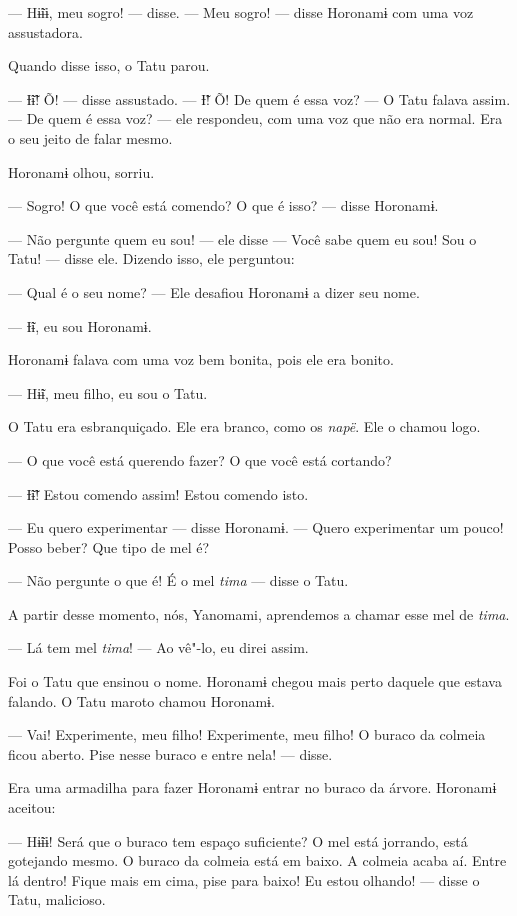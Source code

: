 --- Hɨ̃ɨɨ, meu sogro! --- disse. --- Meu sogro! --- disse Horonamɨ com
uma voz assustadora. 

Quando disse isso, o Tatu parou. 

--- Ɨ̃ɨ̃! Õ! --- disse assustado. --- Ɨ̃! Õ! De quem é essa voz? --- O Tatu
falava assim. --- De quem é essa voz? --- ele respondeu, com uma voz que
não era normal. Era o seu jeito de falar mesmo. 

Horonamɨ olhou, sorriu.

--- Sogro! O que você está comendo? O que é isso? --- disse Horonamɨ. 

--- Não pergunte quem eu sou! --- ele disse --- Você sabe quem eu sou!
Sou o Tatu! --- disse ele. Dizendo isso, ele perguntou: 

--- Qual é o seu nome? --- Ele desafiou Horonamɨ a dizer seu nome. 

--- Ɨ̃ɨ, eu sou Horonamɨ. 

Horonamɨ falava com uma voz bem bonita, pois ele era bonito. 

--- Hɨ̃ɨ, meu filho, eu sou o Tatu. 

O Tatu era esbranquiçado. Ele era branco, como os \emph{napë}. Ele o
chamou logo. 

--- O que você está querendo fazer? O que você está cortando? 

--- Ɨ̃ɨ̃! Estou comendo assim! Estou comendo isto.

--- Eu quero experimentar --- disse Horonamɨ. --- Quero experimentar um
pouco! Posso beber? Que tipo de mel é? 

--- Não pergunte o que é! É o mel \emph{tima} --- disse o Tatu. 

A partir desse momento, nós, Yanomami, aprendemos a chamar esse mel
de \emph{tima}. 

--- Lá tem mel \emph{tima}! --- Ao vê"-lo, eu direi assim. 

Foi o Tatu que ensinou o nome. Horonamɨ chegou mais perto daquele que
estava falando. O Tatu maroto chamou Horonamɨ. 

--- Vai! Experimente, meu filho! Experimente, meu filho! O buraco da
colmeia ficou aberto. Pise nesse buraco e entre nela! --- disse. 

Era uma armadilha para fazer Horonamɨ entrar no buraco da árvore. Horonamɨ
aceitou: 

--- Hɨ̃ɨɨ! Será que o buraco tem espaço suficiente? O mel está jorrando,
está gotejando mesmo. O buraco da colmeia está em baixo. A colmeia acaba
aí. Entre lá dentro! Fique mais em cima, pise para baixo! Eu estou
olhando! --- disse o Tatu, malicioso. 

